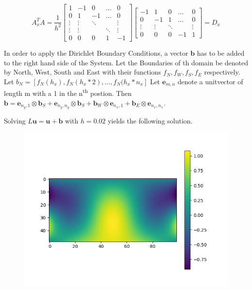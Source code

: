 \documentclass{article}
\begin{document}
\begin{equation}
	 A_x^T A = \frac{1}{h^2}\begin{bmatrix}
                1 & -1 & 0&\dots & 0 \\
       		0&1&-1&\dots&0\\
			\vdots&\vdots&\ddots& &\vdots\\
\vdots&\vdots& &\ddots&\vdots\\
0&0&0&1&-1
\end{bmatrix}
\begin{bmatrix}
                -1 & 1 & 0&\dots & 0 \\
       		0&-1&1&\dots&0\\
			\vdots&\vdots&\ddots& &\vdots\\

0&0&0&-1&1
\end{bmatrix}
= D_x
\end{equation}


In order to apply the Dirichlet Boundary Conditions, a vector $\mathbf{b}$ has to be added to the right hand side of the System. Let the Boundaries of th domain be denoted by North, West, South and East with their functions $f_N, f_W, f_S, f_E$ respectively. Let $b_N = \left[f_N(h_x), f_N(h_x*2), \dots, f_N(h_x*n_x\right]$ %
Let $\mathbf{e}_{m,n}$ denote a unitvector of length m with a 1 in the n\textsuperscript{th} postion.
Then $\mathbf{b} = \mathbf{e}_{n_y,1} \otimes \mathbf{b}_S + \mathbf{e}_{n_y,n_y} \otimes \mathbf{b}_S + \mathbf{b}_W \otimes \mathbf{e}_{n_x,1} + \mathbf{b}_E \otimes \mathbf{e}_{n_x,n_x}$.

Solving $L\mathbf{u} = \mathbf{u}+\mathbf{b}$ with $h=0.02$ yields the following solution.
\begin{figure}[H]
\centering
\includegraphics[width=.9\linewidth]{Figure_1.png}

\end{figure}

\end{document}
